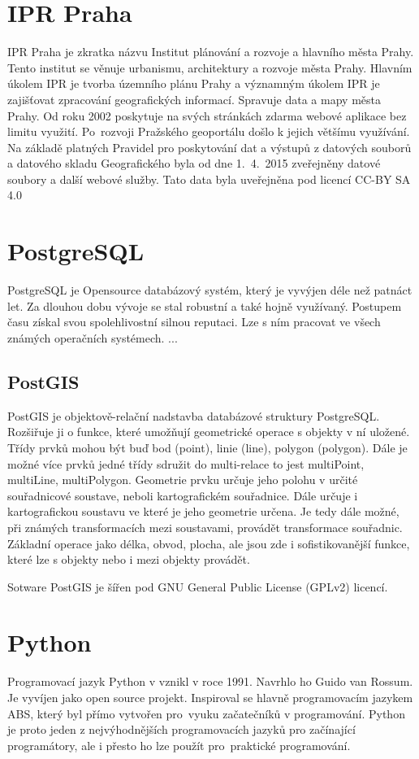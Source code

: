 \section{IPR Praha}
\label{IPR Praha}
IPR Praha je zkratka názvu Institut plánování a rozvoje a hlavního města Prahy. 
Tento institut se věnuje urbanismu, architektury a rozvoje města Prahy. Hlavním
úkolem IPR je tvorba územního plánu Prahy a významným úkolem IPR je zajišťovat
zpracování geografických informací. Spravuje data a mapy města Prahy. Od roku 
2002 poskytuje na svých stránkách zdarma webové aplikace bez limitu využití. 
Po~rozvoji Pražského geoportálu došlo k jejich většímu využívání.  Na základě 
platných Pravidel pro poskytování dat a  výstupů z datových souborů a datového 
skladu Geografického byla od dne 1.~4.~2015 zveřejněny datové soubory a další 
webové služby. Tato data byla uveřejněna pod licencí CC-BY SA 4.0 \cite{IPR}


\section{PostgreSQL}
\label{PostgreSQL}
PostgreSQL je Opensource databázový systém, který je vyvýjen déle než patnáct
let. Za dlouhou dobu vývoje se stal robustní a také hojně využívaný.
Postupem času získal svou spolehlivostní silnou reputaci.
Lze s ním pracovat ve všech známých operačních systémech. ...
\cite{PostgreSQL}

\subsection{PostGIS}
\label{PostGIS}
PostGIS je objektově-relační nadstavba databázové struktury PostgreSQL.
Rozšiřuje ji o funkce, které umožňují geometrické operace s objekty v ní uložené.
Třídy prvků mohou být buď bod (point), linie (line), polygon (polygon).
Dále je možné více prvků jedné třídy sdružit do multi-relace 
to jest  multiPoint, multiLine, multiPolygon.
Geometrie prvku určuje jeho polohu v určité souřadnicové soustave, neboli 
kartografickém souřadnice. Dále určuje i kartografickou soustavu ve které je 
jeho geometrie určena. Je tedy dále možné, při známých transformacích mezi
soustavami, provádět transformace souřadnic. Základní operace jako délka, obvod,
plocha, ale jsou zde i sofistikovanější funkce, které lze s objekty nebo i mezi 
objekty provádět.

Sotware PostGIS je šířen pod GNU General Public License (GPLv2) licencí.


\section{Python}
\label{Python}
Programovací jazyk Python v vznikl v roce 1991. Navrhlo ho Guido van Rossum. 
Je vyvíjen jako open source projekt. Inspiroval se hlavně programovacím jazykem
ABS, který byl přímo vytvořen pro~vyuku začatečníků v programování. Python je 
proto jeden z nejvýhodnějších programovacích jazyků pro začínající programátory,
ale i přesto ho lze použít pro~praktické programování. 


